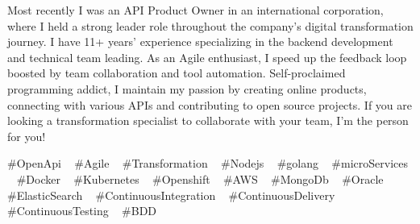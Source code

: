 

\begin{cvparagraph}

Most recently I was an API Product Owner in an international corporation, where I held a strong leader role throughout the company's digital transformation journey. I have 11+ years’ experience specializing in the backend development and technical team leading.
As an Agile enthusiast, I speed up the feedback loop boosted by team collaboration and tool automation.
Self-proclaimed programming addict, I maintain my passion by creating online products, connecting with various APIs and contributing to open source projects. If you are looking a transformation specialist to collaborate with your team, I'm the person for you!

\end{cvparagraph}
\begin{cvtechnologies}
 \#OpenApi ~
 \#Agile ~
 \#Transformation ~
 \#Nodejs ~
 \#golang ~
 \#microServices ~
 \#Docker ~
 \#Kubernetes ~
 \#Openshift ~
 \#AWS ~
 \#MongoDb ~
 \#Oracle ~
 \#ElasticSearch ~
 \#ContinuousIntegration ~
 \#ContinuousDelivery ~
 \#ContinuousTesting ~
 \#BDD 
\end{cvtechnologies}
